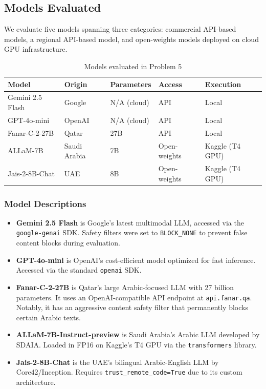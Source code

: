 \subsection{Models Evaluated}

We evaluate five models spanning three categories: commercial API-based models, a regional API-based model, and open-weights models deployed on cloud GPU infrastructure.

\begin{table}[H]
    \centering
    \caption{Models evaluated in Problem 5}
    \label{tab:models}
    \begin{tabular}{|l|l|l|l|l|}
        \hline
        \textbf{Model} & \textbf{Origin} & \textbf{Parameters} & \textbf{Access} & \textbf{Execution} \\
        \hline
        Gemini 2.5 Flash & Google & N/A (cloud) & API & Local \\
        GPT-4o-mini & OpenAI & N/A (cloud) & API & Local \\
        Fanar-C-2-27B & Qatar & 27B & API & Local \\
        ALLaM-7B & Saudi Arabia & 7B & Open-weights & Kaggle (T4 GPU) \\
        Jais-2-8B-Chat & UAE & 8B & Open-weights & Kaggle (T4 GPU) \\
        \hline
    \end{tabular}
\end{table}

\subsubsection{Model Descriptions}

\begin{itemize}
    \item \textbf{Gemini 2.5 Flash} is Google's latest multimodal LLM, accessed via the \texttt{google-genai} SDK. Safety filters were set to \texttt{BLOCK\_NONE} to prevent false content blocks during evaluation.

    \item \textbf{GPT-4o-mini} is OpenAI's cost-efficient model optimized for fast inference. Accessed via the standard \texttt{openai} SDK.

    \item \textbf{Fanar-C-2-27B} is Qatar's large Arabic-focused LLM with 27 billion parameters. It uses an OpenAI-compatible API endpoint at \texttt{api.fanar.qa}. Notably, it has an aggressive content safety filter that permanently blocks certain Arabic texts.

    \item \textbf{ALLaM-7B-Instruct-preview} is Saudi Arabia's Arabic LLM developed by SDAIA. Loaded in FP16 on Kaggle's T4 GPU via the \texttt{transformers} library.

    \item \textbf{Jais-2-8B-Chat} is the UAE's bilingual Arabic-English LLM by Core42/Inception. Requires \texttt{trust\_remote\_code=True} due to its custom architecture.
\end{itemize}

